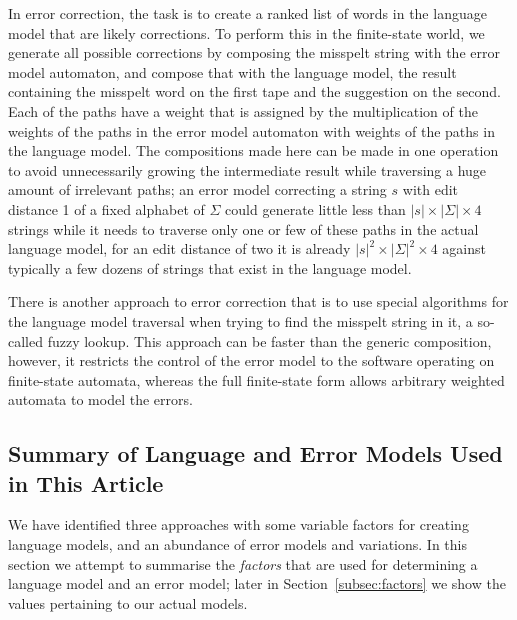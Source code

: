 \documentclass[a4paper,12pt]{article}
\begin{document}
In error correction, the task is to create a ranked list of words in the
language model that are likely corrections. To perform this in the finite-state
world, we generate all possible corrections by composing the misspelt string
with the error model automaton, and compose that with the language model, the
result containing the misspelt word on the first tape and the suggestion on the
second. Each of the paths have a weight that is assigned by the multiplication
of the weights of the paths in the error model automaton with weights of the
paths in the language model. The compositions made here can be made in one
operation~\cite{hfst/2012/cla} to avoid unnecessarily growing the intermediate
result while traversing a huge amount of irrelevant paths; an error model
correcting a string $s$ with edit distance 1 of a fixed alphabet of $\Sigma$
could generate little less than $|s| \times |\Sigma| \times 4$ strings while it
needs to traverse only one or few of these paths in the actual language model,
for an edit distance of two it is already $|s|^2 \times |\Sigma|^2 \times 4$
against typically a few dozens of strings that exist in the language model.

There is another approach to error correction that is to use special algorithms
for the language model traversal when trying to find the misspelt string in it,
a so-called fuzzy lookup. This approach can be faster than the generic
composition, however, it restricts the control of the error model to the
software operating on finite-state automata, whereas the full finite-state form
allows arbitrary weighted automata to model the errors.

\subsection{Summary of Language and Error Models Used in This Article}
\label{subsec:summary}

We have identified three approaches with some variable factors for creating
language models, and an abundance of error models and variations. In this
section we attempt to summarise the \emph{factors} that are used for
determining a language model and an error model; later in
Section~\ref{subsec:factors} we show the values pertaining to our actual
models.
\end{document}
